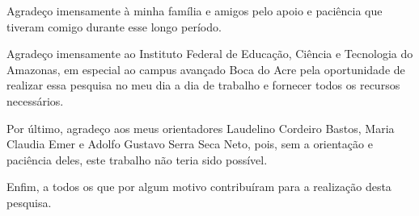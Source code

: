 
\begin{agradecimentos}%

Agradeço imensamente à minha família e amigos pelo apoio e paciência que tiveram comigo
durante esse longo período. 

Agradeço imensamente ao Instituto Federal de Educação, Ciência e Tecnologia do Amazonas, em especial ao campus avançado Boca do Acre pela oportunidade de realizar essa pesquisa no
meu dia a dia de trabalho e fornecer todos os recursos necessários. 

Por último, agradeço aos meus orientadores Laudelino Cordeiro Bastos, Maria Claudia Emer e Adolfo Gustavo Serra Seca Neto, pois, sem a orientação e paciência deles, este trabalho não teria sido possível.

%
%
%


Enfim, a todos os que por algum motivo contribuíram para a realização desta pesquisa.






\end{agradecimentos}
